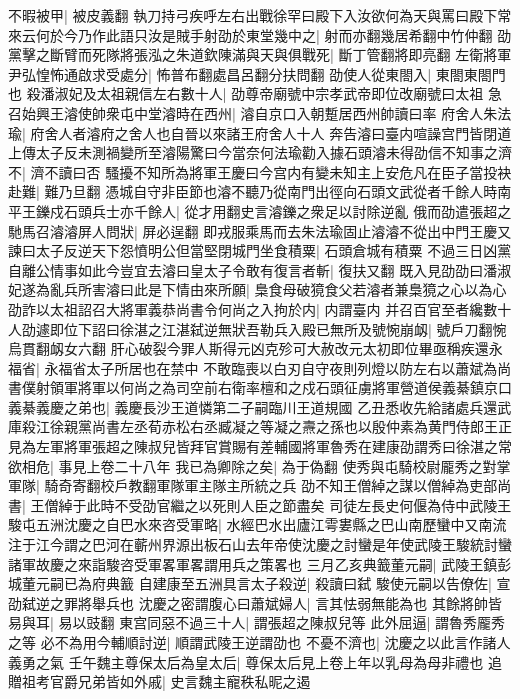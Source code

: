 不暇被甲|{
	被皮義翻}
執刀持弓疾呼左右出戰徐罕曰殿下入汝欲何為天與罵曰殿下常來云何於今乃作此語只汝是賊手射劭於東堂幾中之|{
	射而亦翻幾居希翻中竹仲翻}
劭黨擊之斷臂而死隊將張泓之朱道欽陳滿與天與俱戰死|{
	斷丁管翻將即亮翻}
左衛將軍尹弘惶怖通啟求受處分|{
	怖普布翻處昌呂翻分扶問翻}
劭使人從東閤入|{
	東閤東閤門也}
殺潘淑妃及太祖親信左右數十人|{
	劭尊帝廟號中宗孝武帝即位改廟號曰太祖}
急召始興王濬使帥衆屯中堂濬時在西州|{
	濬自京口入朝蹔居西州帥讀曰率}
府舍人朱法瑜|{
	府舍人者濬府之舍人也自晉以來諸王府舍人十人}
奔告濬曰臺内喧譟宫門皆閉道上傳太子反未測禍變所至濬陽驚曰今當奈何法瑜勸入據石頭濬未得劭信不知事之濟不|{
	濟不讀曰否}
騷擾不知所為將軍王慶曰今宫内有變未知主上安危凡在臣子當投袂赴難|{
	難乃旦翻}
憑城自守非臣節也濬不聽乃從南門出徑向石頭文武從者千餘人時南平王鑠戍石頭兵士亦千餘人|{
	從才用翻史言濬鑠之衆足以討除逆亂}
俄而劭遣張超之馳馬召濬濬屏人問狀|{
	屏必逞翻}
即戎服乘馬而去朱法瑜固止濬濬不從出中門王慶又諫曰太子反逆天下怨憤明公但當堅閉城門坐食積粟|{
	石頭倉城有積粟}
不過三日凶黨自離公情事如此今豈宜去濬曰皇太子令敢有復言者斬|{
	復扶又翻}
既入見劭劭曰潘淑妃遂為亂兵所害濬曰此是下情由來所願|{
	梟食母破獍食父若濬者兼梟獍之心以為心}
劭詐以太祖詔召大將軍義恭尚書令何尚之入拘於内|{
	内謂臺内}
并召百官至者纔數十人劭遽即位下詔曰徐湛之江湛弑逆無狀吾勒兵入殿已無所及號惋崩衂|{
	號戶刀翻惋烏貫翻衂女六翻}
肝心破裂今罪人斯得元凶克殄可大赦改元太初即位畢亟稱疾還永福省|{
	永福省太子所居也在禁中}
不敢臨喪以白刃自守夜則列燈以防左右以蕭斌為尚書僕射領軍將軍以何尚之為司空前右衛率檀和之戍石頭征虜將軍營道侯義綦鎮京口義綦義慶之弟也|{
	義慶長沙王道憐第二子嗣臨川王道規國}
乙丑悉收先給諸處兵還武庫殺江徐親黨尚書左丞荀赤松右丞臧凝之等凝之燾之孫也以殷仲素為黄門侍郎王正見為左軍將軍張超之陳叔兒皆拜官賞賜有差輔國將軍魯秀在建康劭謂秀曰徐湛之常欲相危|{
	事見上卷二十八年}
我已為卿除之矣|{
	為于偽翻}
使秀與屯騎校尉龎秀之對掌軍隊|{
	騎奇寄翻校戶教翻軍隊軍主隊主所統之兵}
劭不知王僧綽之謀以僧綽為吏部尚書|{
	王僧綽于此時不受劭官繼之以死則人臣之節盡矣}
司徒左長史何偃為侍中武陵王駿屯五洲沈慶之自巴水來咨受軍略|{
	水經巴水出廬江雩婁縣之巴山南歷蠻中又南流注于江今謂之巴河在蘄州界源出板石山去年帝使沈慶之討蠻是年使武陵王駿統討蠻諸軍故慶之來詣駿咨受軍畧軍畧謂用兵之策畧也}
三月乙亥典籖董元嗣|{
	武陵王鎮彭城董元嗣已為府典籖}
自建康至五洲具言太子殺逆|{
	殺讀曰弑}
駿使元嗣以告僚佐|{
	宣劭弑逆之罪將舉兵也}
沈慶之密謂腹心曰蕭斌婦人|{
	言其怯弱無能為也}
其餘將帥皆易與耳|{
	易以豉翻}
東宫同惡不過三十人|{
	謂張超之陳叔兒等}
此外屈逼|{
	謂魯秀龎秀之等}
必不為用今輔順討逆|{
	順謂武陵王逆謂劭也}
不憂不濟也|{
	沈慶之以此言作諸人義勇之氣}
壬午魏主尊保太后為皇太后|{
	尊保太后見上卷上年以乳母為母非禮也}
追贈祖考官爵兄弟皆如外戚|{
	史言魏主寵秩私昵之遏}
